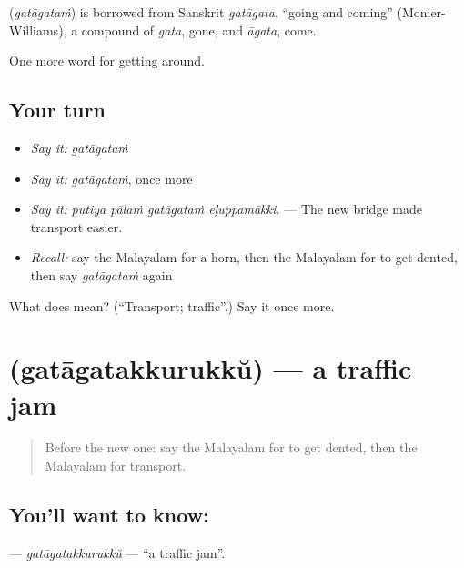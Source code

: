 \begin{cousinweb}
\textbf{} (\emph{gatāgataṁ}) is borrowed from Sanskrit \emph{gatāgata}, \textquotedblleft{}going and coming\textquotedblright{} (Monier-Williams), a compound of \emph{gata}, gone, and \emph{āgata}, come.
\end{cousinweb}

\begin{grammarlens}[title={What you've built}]
One more word for getting around.
\end{grammarlens}

\subsection*{Your turn}
\begin{itemize}
\raggedright
  \item \emph{Say it:} \emph{gatāgataṁ}
  \item \emph{Say it:} \emph{gatāgataṁ}, once more
  \item \emph{Say it:} \emph{putiya pālaṁ gatāgataṁ eḷuppamākki.} — The new bridge made transport easier.
  \item \emph{Recall:} say the Malayalam for a horn, then the Malayalam for to get dented, then say \emph{gatāgataṁ} again
\end{itemize}

\begin{tcolorbox}[breakable,colback=teal!4,colframe=teal!35!black,title={Before you move on}]
What does  mean? (\textquotedblleft{}Transport; traffic\textquotedblright{}.) Say it once more.
\end{tcolorbox}
\section[\texorpdfstring{\ml{ഗതാഗതക്കുരുക്ക്} (gatāgatakkurukkŭ)}{ഗതാഗതക്കുരുക്ക് (gatāgatakkurukkŭ)}]{ (gatāgatakkurukkŭ) — a traffic jam}

\label{lesson:ML-C472-gatagatakkurukku}



\begin{quote}
Before the new one: say the Malayalam for to get dented, then the Malayalam for transport.
\end{quote}

\subsection*{You'll want to know: }
\textbf{} — \emph{gatāgatakkurukkŭ} — \textquotedblleft{}a traffic jam\textquotedblright{}.

